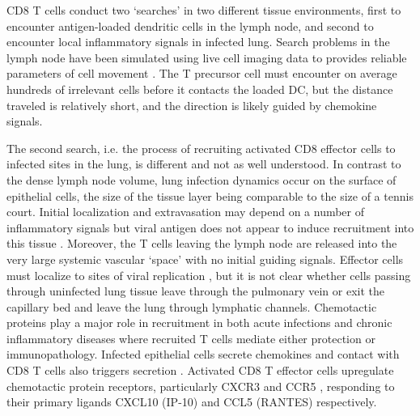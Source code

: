 \documentclass[10pt]{article}
\begin{document}
CD8 T cells conduct two `searches' in two different tissue environments, first to encounter antigen-loaded dendritic cells in the lymph node, and second to encounter local inflammatory signals in infected lung.  Search problems in the lymph node have been simulated using live cell imaging data to provides reliable parameters of cell movement \cite{Vroomans2012}.  The T precursor cell must encounter on average hundreds of irrelevant cells before it contacts the loaded DC, but the distance traveled is relatively short, and the direction is likely guided by chemokine signals.  

The second search, i.e. the process of recruiting activated CD8 effector cells to infected sites in the lung,  is different and not as well understood.  In contrast to the dense lymph node volume, lung infection dynamics occur on the surface of epithelial cells, the size of the tissue layer being comparable to the size of a tennis court.  Initial localization and extravasation may depend on a number of inflammatory signals but viral antigen does not appear to induce recruitment into this tissue \cite{Topham2001}.   Moreover, the T cells leaving the lymph node are released into the very large systemic vascular `space' with no initial guiding signals.  Effector cells must localize to sites of viral replication \cite{Cerwenka1999}, but it is not clear whether cells passing through uninfected lung tissue leave through the pulmonary vein or exit the capillary bed and leave the lung through lymphatic channels. Chemotactic proteins play a major role in recruitment in both acute infections and chronic inflammatory diseases \cite{Bromley2008, Medoff2005, Castellino2006 ,Gunn1998, Okada2005} where recruited T cells mediate either protection or immunopathology.  Infected epithelial cells secrete chemokines \cite{Chan2005} and contact with CD8 T cells also triggers secretion \cite{Zhao2000}. Activated CD8 T effector cells upregulate chemotactic protein receptors, particularly CXCR3 and CCR5 \cite{Hoji2005, Groom2011a}, responding to their primary ligands CXCL10 (IP-10) and CCL5 (RANTES) respectively.  
\end{document}
